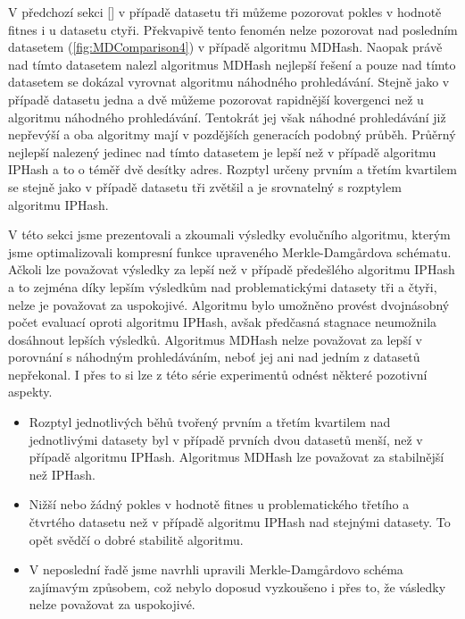 V předchozí sekci [] v případě datasetu tři můžeme pozorovat pokles v hodnotě fitnes i u datasetu ctyři. Překvapivě
tento fenomén nelze pozorovat nad posledním datasetem (\ref{fig:MDComparison4}) v případě algoritmu MDHash. Naopak právě nad tímto datasetem
nalezl algoritmus MDHash nejlepší řešení a pouze nad tímto datasetem se dokázal vyrovnat algoritmu náhodného prohledávání.
Stejně jako v případě datasetu jedna a dvě můžeme pozorovat rapidnější kovergenci než u algoritmu náhodného prohledávání.
Tentokrát jej však náhodné prohledávání již nepřevýší a oba algoritmy mají v pozdějších generacích podobný průběh. Průěrný 
nejlepší nalezený jedinec nad tímto datasetem je lepší než v případě algoritmu IPHash a to o téměř dvě desítky adres. Rozptyl
určeny prvním a třetím kvartilem se stejně jako v případě datasetu tři zvětšil a je srovnatelný s rozptylem algoritmu IPHash.

V této sekci jsme prezentovali a zkoumali výsledky evolučního algoritmu, kterým jsme optimalizovali kompresní funkce
upraveného Merkle-Damg\r{a}rdova schématu. Ačkoli lze považovat výsledky za lepší než v případě předešlého algoritmu IPHash a to
zejména díky lepším výsledkům nad problematickými datasety tři a čtyři, nelze je považovat za uspokojivé. Algoritmu bylo
umožněno provést dvojnásobný počet evaluací oproti algoritmu IPHash, avšak předčasná stagnace neumožnila dosáhnout lepších
výsledků. Algoritmus MDHash nelze považovat za lepší v porovnání s náhodným prohledáváním, neboť jej ani nad jedním z datasetů
nepřekonal. I přes to si lze z této série experimentů odnést některé pozotivní aspekty.

\begin{itemize}
	\item Rozptyl jednotlivých běhů tvořený prvním a třetím kvartilem nad jednotlivými datasety byl v případě prvních dvou datasetů menší, než
		v případě algoritmu IPHash. Algoritmus MDHash lze považovat za stabilnější než IPHash.
	
	\item Nižší nebo žádný pokles v hodnotě fitnes u problematického třetího a čtvrtého datasetu než v případě algoritmu IPHash nad stejnými
		datasety. To opět svědčí o dobré stabilitě algoritmu.
		
	\item V neposlední řadě jsme navrhli upravili Merkle-Damg\r{a}rdovo schéma zajímavým způsobem, což nebylo doposud vyzkoušeno i přes to,
		že vásledky nelze považovat za uspokojivé.
\end{itemize}

